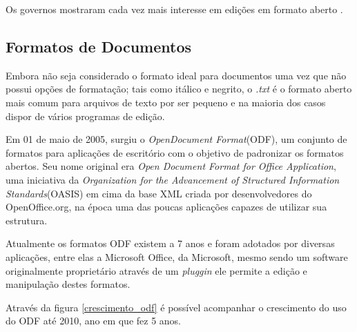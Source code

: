 Os governos mostraram cada vez mais interesse em edições em formato aberto \cite{WIKIPEDIA-FORMATO-ABERTO}.

\subsection{Formatos de Documentos}

Embora não seja considerado o formato ideal para documentos uma vez que não possui opções de formatação; tais como itálico e negrito, o \textit{.txt} é o formato aberto mais comum para arquivos de texto por ser pequeno e na maioria dos casos dispor de vários programas de edição.

Em 01 de maio de 2005, surgiu o \textit{OpenDocument Format}(ODF), um conjunto de formatos para aplicações de escritório com o objetivo de padronizar os formatos abertos. Seu nome original era \textit{Open Document Format for Office Application}, uma iniciativa da \textit{Organization for the Advancement of Structured Information Standards}(OASIS) em cima da base XML criada por desenvolvedores do OpenOffice.org, na época uma das poucas aplicações capazes de utilizar sua estrutura.

Atualmente os formatos ODF existem a 7 anos e foram adotados por diversas aplicações, entre elas a Microsoft Office, da Microsoft, mesmo sendo um software originalmente proprietário através de um \textit{pluggin} ele permite a edição e manipulação destes formatos.

Através da figura \ref{crescimento_odf} é possível acompanhar o crescimento do uso do ODF até 2010, ano em que fez 5 anos.

